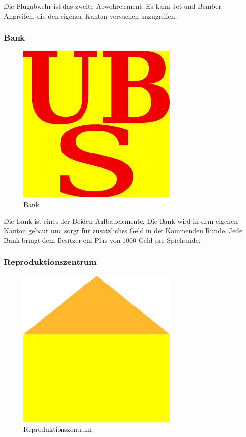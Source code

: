 \documentclass[ngerman, 12pt, pdftex]{scrartcl}[2006/07/30]
\begin{document}
Die Flugabwehr ist das zweite Abwehrelement. Es kann Jet und Bomber Angreifen, die den eigenen Kanton versuchen anzugreifen.

\newpage

\subsubsection{Bank}

\begin{figure}[h]
\centering
\includegraphics[scale=1.8]{einheiten/Bank.png}
\caption{Bank}
\end{figure}

Die Bank ist eines der Beiden Aufbauelemente. Die Bank wird in dem eigenen Kanton gebaut und sorgt für zusätzliches Geld in der Kommenden Runde. Jede Bank bringt dem Besitzer ein Plus von 1000 Geld pro Spielrunde.

\subsubsection{Reproduktionszentrum}

\begin{figure}[h]
\centering
\includegraphics[scale=2]{einheiten/Repro.png}
\caption{Reproduktionszentrum}
\end{figure}
\end{document}
